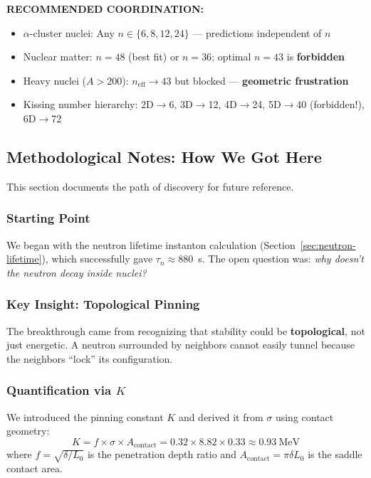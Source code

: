 \begin{tcolorbox}[colback=blue!5!white, colframe=blue!75!black, breakable, title=Topological Pinning Model: Final Verdict]
\textbf{RECOMMENDED COORDINATION:}
\begin{itemize}
    \item $\alpha$-cluster nuclei: Any $n \in \{6, 8, 12, 24\}$ --- predictions independent of $n$
    \item Nuclear matter: $n = 48$ (best fit) or $n = 36$; optimal $n = 43$ is \textbf{forbidden}
    \item Heavy nuclei ($A > 200$): $n_{\text{eff}} \to 43$ but blocked --- \textbf{geometric frustration}
    \item Kissing number hierarchy: 2D$\to$6, 3D$\to$12, 4D$\to$24, 5D$\to$40 (forbidden!), 6D$\to$72
\end{itemize}

\end{tcolorbox}

\subsection{Methodological Notes: How We Got Here}
\label{subsec:m6-methodology}

This section documents the path of discovery for future reference.

\subsubsection{Starting Point}

We began with the neutron lifetime instanton calculation (Section~\ref{sec:neutron-lifetime}), which successfully gave $\tau_n \approx 880$~s. The open question was: \emph{why doesn't the neutron decay inside nuclei?}

\subsubsection{Key Insight: Topological Pinning}

The breakthrough came from recognizing that stability could be \textbf{topological}, not just energetic. A neutron surrounded by neighbors cannot easily tunnel because the neighbors ``lock'' its configuration.

\subsubsection{Quantification via $K$}

We introduced the pinning constant $K$ and derived it from $\sigma$ using contact geometry:
\begin{equation}
    K = f \times \sigma \times A_{\text{contact}} = 0.32 \times 8.82 \times 0.33 \approx 0.93~\text{MeV}
\end{equation}
where $f = \sqrt{\delta/L_0}$ is the penetration depth ratio and $A_{\text{contact}} = \pi \delta L_0$ is the saddle contact area.

